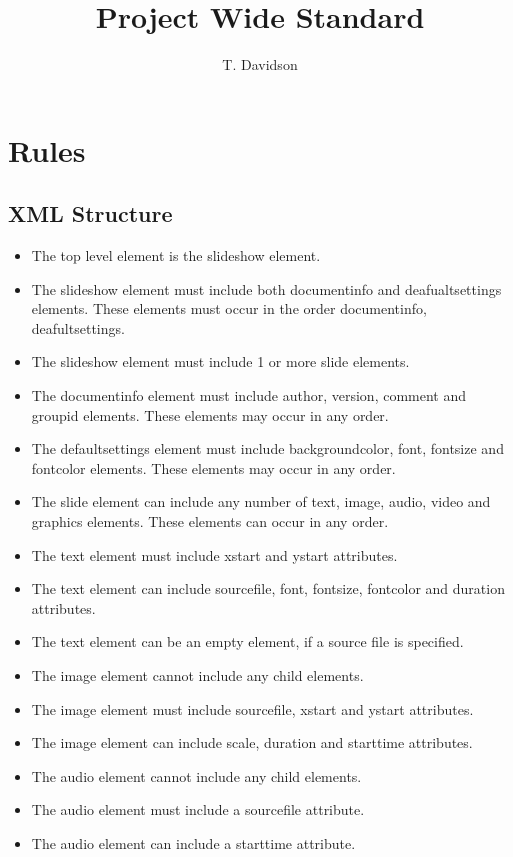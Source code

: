 \documentclass[oneside]{article}
\title{Project Wide Standard}
\author{T. Davidson}
\begin{document}
\maketitle

\clearpage

\section{Rules}
\subsection{XML Structure}
\begin{itemize}
\item The top level element is the slideshow element.
\item The slideshow element must include both documentinfo and deafualtsettings elements. These elements must occur in the order documentinfo, deafultsettings.
\item The slideshow element must include 1 or more slide elements.
\item The documentinfo element must include author, version, comment and groupid elements. These elements may occur in any order.
\item The defaultsettings element must include backgroundcolor, font, fontsize and fontcolor elements. These elements may occur in any order.
\item The slide element can include any number of text, image, audio, video and graphics elements. These elements can occur in any order.
\item The text element must include xstart and ystart attributes.
\item The text element can include sourcefile, font, fontsize, fontcolor and duration attributes.
\item The text element can be an empty element, if a source file is specified.
\item The image element cannot include any child elements.
\item The image element must include sourcefile, xstart and ystart attributes.
\item The image element can include scale, duration and starttime attributes.
\item The audio element cannot include any child elements.
\item The audio element must include a sourcefile attribute.
\item The audio element can include a starttime attribute.

\end{itemize}
\end{document}
